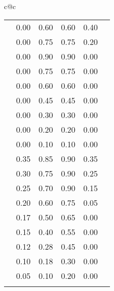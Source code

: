 \begin{footnotesize}
\begin{tabular}{c@{\quad}c}
\begin{tabular}{|c|c|cccc|}
\clspc
\clrow{verydeepred}             & 0.00 & 0.60 & 0.60 & 0.40 \\
\clrow{deepred}                 & 0.00 & 0.75 & 0.75 & 0.20 \\
\clrow{verydarkred}             & 0.00 & 0.90 & 0.90 & 0.00 \\
\clrow{darkred}                 & 0.00 & 0.75 & 0.75 & 0.00 \\
\clrow{red}                     & 0.00 & 0.60 & 0.60 & 0.00 \\
\clrow{lightred}                & 0.00 & 0.45 & 0.45 & 0.00 \\
\clrow{verylightred}            & 0.00 & 0.30 & 0.30 & 0.00 \\
\clrow{palered}                 & 0.00 & 0.20 & 0.20 & 0.00 \\
\clrow{verypalered}             & 0.00 & 0.10 & 0.10 & 0.00 \\
\clspc
\clrow{verydeepbrown}           & 0.35 & 0.85 & 0.90 & 0.35 \\
\clrow{deepbrown}               & 0.30 & 0.75 & 0.90 & 0.25 \\
\clrow{verydarkbrown}           & 0.25 & 0.70 & 0.90 & 0.15 \\
\clrow{darkbrown}               & 0.20 & 0.60 & 0.75 & 0.05 \\
\clrow{brown}                   & 0.17 & 0.50 & 0.65 & 0.00 \\
\clrow{lightbrown}              & 0.15 & 0.40 & 0.55 & 0.00 \\
\clrow{verylightbrown}          & 0.12 & 0.28 & 0.45 & 0.00 \\
\clrow{palebrown}               & 0.10 & 0.18 & 0.30 & 0.00 \\
\clrow{verypalebrown}           & 0.05 & 0.10 & 0.20 & 0.00 \\
      \clspc
      \hline
    \end{tabular}
   \\
  \end{tabular}
\end{footnotesize}
